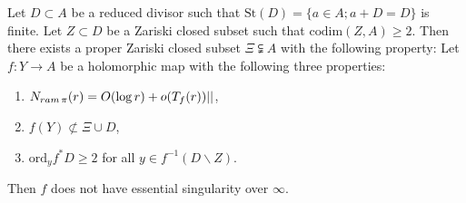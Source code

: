 \documentclass[10pt,a4paper]{amsart}
\newcommand{\ram}{{\rm ram}\,}
\begin{document}
	\begin{proposition}\label{prop:20230405}
		Let $D\subset A$ be a reduced divisor such that $\mathrm{St}(D)=\{ a\in A; a+D=D\}$ is finite.
		Let $Z\subset D$ be a Zariski closed subset such that $\mathrm{codim}(Z,A)\geq 2$.
		Then there exists a proper Zariski closed subset $\Xi\subsetneqq A$ with the following property:
		Let $f:Y\to A$ be a holomorphic map with the following three properties:
		\begin{enumerate}[label=(\alph*)]
			\item  
			$N_{\ram\pi}(r)=O(\log r)+o(T_f(r))||$, 
			\item  
			$f(Y)\not\subset \Xi\cup D$,
			\item
			$\mathrm{ord}_yf^*D\geq 2$ for all $y\in f^{-1}(D\backslash Z)$.	\end{enumerate}
		Then $f$ does not have essential singularity over $\infty$.
	\end{proposition}
\end{document}
